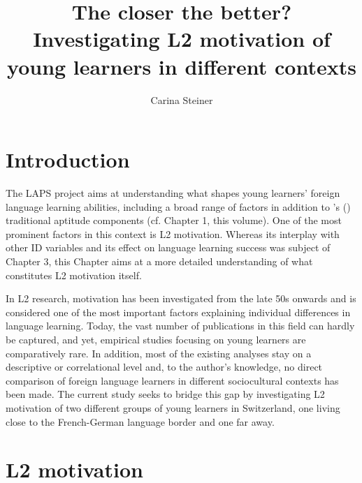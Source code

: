 \documentclass[output=paper]{langsci/langscibook}
\author{Carina Steiner\orcid{}\affiliation{University of Bern, Center for the Study of Language and Society}}
\title[The closer the better?]{The closer the better? Investigating L2 motivation of young learners in different contexts}
\begin{document}
\maketitle 


\section{Introduction}

The LAPS project aims at understanding what shapes young learners’ foreign language learning abilities, including a broad range of factors in addition to \citeauthor{Carroll1958}’s (\citeyear{Carroll1958, Carroll1964}) traditional aptitude components (cf. Chapter 1, this volume). One of the most prominent factors in this context is L2 motivation. Whereas its interplay with other ID variables and its effect on language learning success was subject of Chapter 3, this Chapter aims at a more detailed understanding of what constitutes L2 motivation itself.

In L2 research, motivation has been investigated from the late 50s onwards and is considered one of the most important factors explaining individual differences in language learning. Today, the vast number of publications in this field can hardly be captured, and yet, empirical studies focusing on young learners are comparatively rare. In addition, most of the existing analyses stay on a descriptive or correlational level and, to the author’s knowledge, no direct comparison of foreign language learners in different sociocultural contexts has been made. The current study seeks to bridge this gap by investigating L2 motivation of two different groups of young learners in Switzerland, one living close to the French-German language border and one far away.

\section{L2 motivation}\label{sec:07:2}
\end{document}
